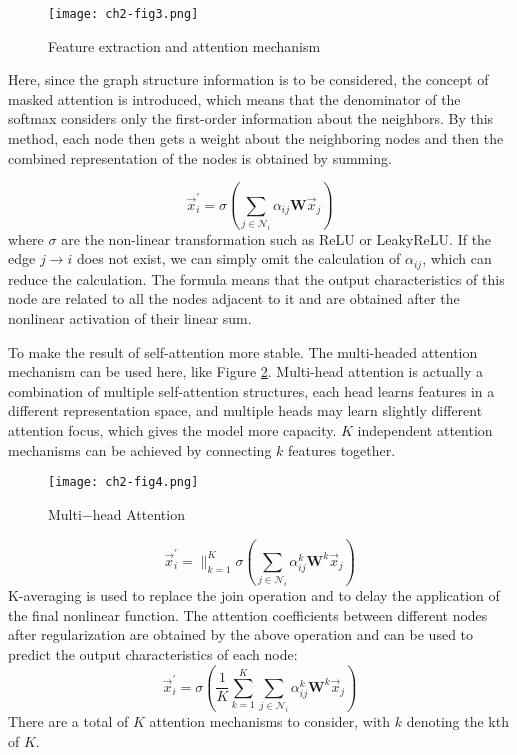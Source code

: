 \begin{figure}[h]
	\centering
	\texttt{[image: ch2-fig3.png]}
	\caption{Feature extraction and attention mechanism}
	\label{fig3}
\end{figure}

Here, since the graph structure information is to be considered, the concept of masked attention is introduced, which means that the denominator of the softmax considers only the first-order information about the neighbors. By this method, each node then gets a weight about the neighboring nodes and then the combined representation of the nodes is obtained by summing.

$$\vec{x}_{i}^{\prime}=\sigma\left(\sum_{j \in \mathcal{N}_{i}} \alpha_{i j} \mathbf{W} \vec{x}_{j}\right)$$
where $\sigma$ are the non-linear transformation such as ReLU or LeakyReLU. If the edge $j \to i$ does not exist, we can simply omit the calculation of $\alpha_{ij}$, which can reduce the calculation. The formula means that the output characteristics of this node are related to all the nodes adjacent to it and are obtained after the nonlinear activation of their linear sum.

To make the result of self-attention more stable. The multi-headed attention mechanism can be used here, like Figure \ref{fig4}. Multi-head attention is actually a combination of multiple self-attention structures, each head learns features in a different representation space, and multiple heads may learn slightly different attention focus, which gives the model more capacity.
$K$ independent attention mechanisms can be achieved by connecting $k$ features together.
\begin{figure}[h]
	\centering
	\texttt{[image: ch2-fig4.png]}
	\caption{Multi−head Attention}
	\label{fig4}
\end{figure}
$$\vec{x}_{i}^{\prime}=\|_{k=1}^{K} \sigma\left(\sum_{j \in \mathcal{N}_{i}} \alpha_{i j}^{k} \mathbf{W}^{k} \vec{x}_{j}\right)$$
K-averaging is used to replace the join operation and to delay the application of the final nonlinear function. The attention coefficients between different nodes after regularization are obtained by the above operation and can be used to predict the output characteristics of each node:
$$\vec{x}_{i}^{\prime}=\sigma\left(\frac{1}{K} \sum_{k=1}^{K} \sum_{j \in \mathcal{N}_{i}} \alpha_{i j}^{k} \mathbf{W}^{k} \vec{x}_{j}\right)$$
There are a total of $K$ attention mechanisms to consider, with $k$ denoting the kth of $K$. 

